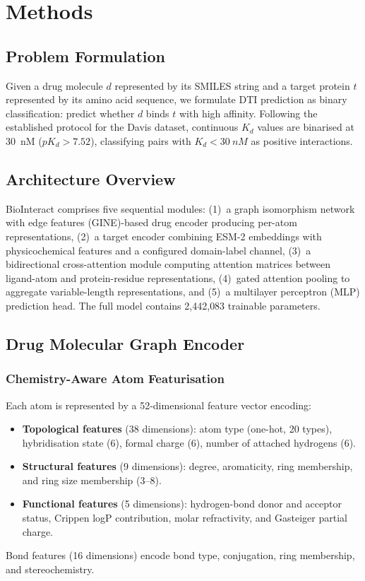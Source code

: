 \documentclass[fleqn,10pt]{wlscirep}
\begin{document}
\section{Methods}
\label{sec:methods}

\subsection{Problem Formulation}

Given a drug molecule $d$ represented by its SMILES string and a target protein
$t$ represented by its amino acid sequence, we formulate DTI prediction as
binary classification: predict whether $d$ binds $t$ with high affinity.
Following the established protocol for the Davis
dataset,\cite{davis2011comprehensive} continuous $K_d$ values are binarised
at \SI{30}{nM} ($pK_d > 7.52$), classifying pairs with $K_d < \SI{30}{nM}$ as
positive interactions.

\subsection{Architecture Overview}

BioInteract comprises five sequential modules:
(1)~a graph isomorphism network with edge features (GINE)-based drug encoder producing per-atom representations,
(2)~a target encoder combining ESM-2 embeddings with physicochemical features
and a configured domain-label channel,
(3)~a bidirectional cross-attention module computing attention matrices between
ligand-atom and protein-residue representations,
(4)~gated attention pooling to aggregate variable-length representations, and
(5)~a multilayer perceptron (MLP) prediction head.
The full model contains 2{,}442{,}083 trainable parameters.

\subsection{Drug Molecular Graph Encoder}

\subsubsection{Chemistry-Aware Atom Featurisation}

Each atom is represented by a 52-dimensional feature vector encoding:
\begin{itemize}[leftmargin=*]
\item \textbf{Topological features} (38 dimensions): atom type (one-hot,
  20 types), hybridisation state (6), formal charge (6), number of
  attached hydrogens (6).
\item \textbf{Structural features} (9 dimensions): degree, aromaticity, ring
  membership, and ring size membership (3--8).
\item \textbf{Functional features} (5 dimensions): hydrogen-bond donor and
  acceptor status, Crippen logP contribution, molar refractivity, and Gasteiger
  partial charge.
\end{itemize}
Bond features (16 dimensions) encode bond type, conjugation, ring membership,
and stereochemistry.
\end{document}
